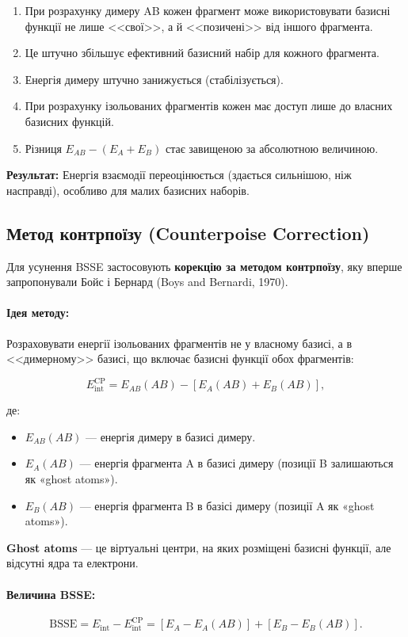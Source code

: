 \begin{enumerate}
    \item При розрахунку димеру AB кожен фрагмент може використовувати базисні функції не лише <<свої>>, а й <<позичені>> від іншого фрагмента.
    \item Це штучно збільшує ефективний базисний набір для кожного фрагмента.
    \item Енергія димеру штучно занижується (стабілізується).
    \item При розрахунку ізольованих фрагментів кожен має доступ лише до власних базисних функцій.
    \item Різниця \(E_{AB} - (E_A + E_B)\) стає завищеною за абсолютною величиною.
\end{enumerate}

\textbf{Результат:} Енергія взаємодії переоцінюється (здається сильнішою, ніж насправді), особливо для малих базисних наборів.

\subsection{Метод контрпоїзу (Counterpoise Correction)}

Для усунення BSSE застосовують \textbf{корекцію за методом контрпоїзу}, яку вперше запропонували Бойс і Бернард (Boys and Bernardi, 1970).

\paragraph{Ідея методу:}
Розраховувати енергії ізольованих фрагментів не у власному базисі, а в <<димерному>> базисі, що включає базисні функції обох фрагментів:

\[
E_{\text{int}}^{\text{CP}} = E_{AB}(AB) - \left[ E_A(AB) + E_B(AB) \right],
\]

де:
\begin{itemize}
    \item \(E_{AB}(AB)\) --- енергія димеру в базисі димеру.
    \item \(E_A(AB)\) --- енергія фрагмента A в базисі димеру (позиції B залишаються як «ghost atoms»).
    \item \(E_B(AB)\) --- енергія фрагмента B в базісі димеру (позиції A як «ghost atoms»).
\end{itemize}

\textbf{Ghost atoms} --- це віртуальні центри, на яких розміщені базисні функції, але відсутні ядра та електрони.

\paragraph{Величина BSSE:}
\[
\text{BSSE} = E_{\text{int}} - E_{\text{int}}^{\text{CP}} = \left[E_A - E_A(AB)\right] + \left[E_B - E_B(AB)\right].
\]


